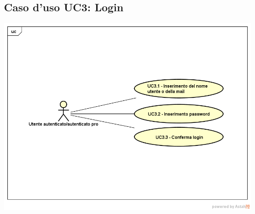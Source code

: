 \subsection{Caso d'uso UC3: Login}
\begin{center}
	\includegraphics[scale=0.5]{UML/UC3.png}
\end{center}
